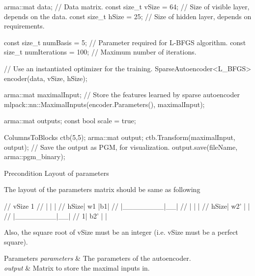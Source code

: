 \begin{DoxyCode}
arma::mat data; \textcolor{comment}{// Data matrix.}
\textcolor{keyword}{const} \textcolor{keywordtype}{size\_t} vSize = 64; \textcolor{comment}{// Size of visible layer, depends on the data.}
\textcolor{keyword}{const} \textcolor{keywordtype}{size\_t} hSize = 25; \textcolor{comment}{// Size of hidden layer, depends on requirements.}

\textcolor{keyword}{const} \textcolor{keywordtype}{size\_t} numBasis = 5; \textcolor{comment}{// Parameter required for L-BFGS algorithm.}
\textcolor{keyword}{const} \textcolor{keywordtype}{size\_t} numIterations = 100; \textcolor{comment}{// Maximum number of iterations.}

\textcolor{comment}{// Use an instantiated optimizer for the training.}
SparseAutoencoder<L\_BFGS> encoder(data, vSize, hSize);

arma::mat maximalInput; \textcolor{comment}{// Store the features learned by sparse autoencoder}
mlpack::nn::MaximalInputs(encoder.Parameters(), maximalInput);

arma::mat outputs;
\textcolor{keyword}{const} \textcolor{keywordtype}{bool} scale = \textcolor{keyword}{true};

ColumnsToBlocks ctb(5,5);
arma::mat output;
ctb.Transform(maximalInput, output);
\textcolor{comment}{// Save the output as PGM, for visualization.}
output.save(fileName, arma::pgm\_binary);
\end{DoxyCode}


\begin{DoxyPrecond}{Precondition}
Layout of parameters
\end{DoxyPrecond}
The layout of the parameters matrix should be same as following 
\begin{DoxyCode}
\textcolor{comment}{//          vSize   1}
\textcolor{comment}{//       |        |  |}
\textcolor{comment}{//  hSize|   w1   |b1|}
\textcolor{comment}{//       |\_\_\_\_\_\_\_\_|\_\_|}
\textcolor{comment}{//       |        |  |}
\textcolor{comment}{//  hSize|   w2'  |  |}
\textcolor{comment}{//       |\_\_\_\_\_\_\_\_|\_\_|}
\textcolor{comment}{//      1|   b2'  |  |}
\end{DoxyCode}


Also, the square root of v\+Size must be an integer (i.\+e. v\+Size must be a perfect square).


\begin{DoxyParams}{Parameters}
{\em parameters} & The parameters of the autoencoder. \\
\hline
{\em output} & Matrix to store the maximal inputs in. \\
\hline
\end{DoxyParams}
\mbox{\label{namespacemlpack_1_1nn_a9887e1e5ada8c7d5fb1ad59dc4d16b4a}} 
